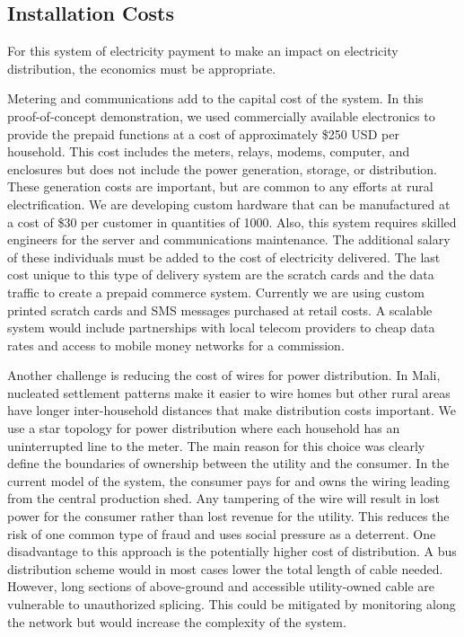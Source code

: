 \documentclass{sig-alternate}
\begin{document}
\subsection{Installation Costs}
For this system of electricity payment to make an impact on electricity
distribution, the economics must be appropriate.

Metering and communications add to the capital cost of the system.  
In this proof-of-concept demonstration, we used commercially available 
electronics to provide the prepaid functions at a cost of approximately
\$250 USD per household.
This cost includes the meters, relays, modems, computer, and enclosures but 
does not include the power generation, storage, or distribution.
These generation costs are important, but are common to any efforts at 
rural electrification.
We are developing custom hardware that can be manufactured at a cost
of \$30 per customer in quantities of 1000.
Also, this system requires skilled engineers for the server and communications
maintenance.  
The additional salary of these individuals must be added to the cost of 
electricity delivered.
The last cost unique to this type of delivery system are the scratch cards
and the data traffic to create a prepaid commerce system.
Currently we are using custom printed scratch cards and SMS messages 
purchased at retail costs. 
A scalable system would include partnerships with local telecom providers
to cheap data rates and access to mobile money networks for a commission.

Another challenge is reducing the cost of wires for power distribution.
In Mali, nucleated settlement patterns make it easier to wire homes but
other rural areas have longer inter-household distances that make 
distribution costs important.
We use a star topology for power distribution where each household has an
uninterrupted line to the meter.
The main reason for this
choice was clearly define the boundaries of ownership between the utility
and the consumer.
In the current model of the system, the consumer pays for
and owns the wiring leading from the central production shed.  Any tampering
of the wire will result in lost power for the consumer rather than lost
revenue for the utility.  This reduces the risk of one common type of fraud
and uses social pressure as a deterrent.
One disadvantage to this approach is the potentially higher cost of distribution.
A bus distribution scheme would in most cases lower the total length of
cable needed.  However, long sections of above-ground and accessible
utility-owned cable are vulnerable to unauthorized splicing.
This could be mitigated by monitoring along the network but would increase
the complexity of the system.
\end{document}
